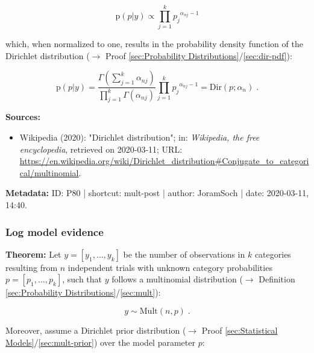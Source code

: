 \documentclass[a4paper,12pt,twoside]{book}
\begin{document}
\begin{equation} \label{eq:mult-post-Mult-post-s2}
\mathrm{p}(p|y) \propto \prod_{j=1}^{k} {p_j}^{\alpha_{nj}-1}
\end{equation}

which, when normalized to one, results in the probability density function of the Dirichlet distribution ($\rightarrow$ Proof \ref{sec:Probability Distributions}/\ref{sec:dir-pdf}):

\begin{equation} \label{eq:mult-post-Mult-post-qed}
\mathrm{p}(p|y) = \frac{\Gamma \left( \sum_{j=1}^{k} \alpha_{nj} \right)}{\prod_{j=1}^k \Gamma(\alpha_{nj})} \prod_{j=1}^{k} {p_j}^{\alpha_{nj}-1} = \mathrm{Dir}(p; \alpha_n) \; .
\end{equation}


\vspace{1em}
\textbf{Sources:}
\begin{itemize}
\item Wikipedia (2020): "Dirichlet distribution"; in: \textit{Wikipedia, the free encyclopedia}, retrieved on 2020-03-11; URL: \url{https://en.wikipedia.org/wiki/Dirichlet_distribution#Conjugate_to_categorical/multinomial}.
\end{itemize}


\vspace{1em}
\textbf{Metadata:} ID: P80 | shortcut: mult-post | author: JoramSoch | date: 2020-03-11, 14:40.
\vspace{1em}



\subsubsection[\textbf{Log model evidence}]{Log model evidence} \label{sec:mult-lme}
\setcounter{equation}{0}

\textbf{Theorem:} Let $y = [y_1, \ldots, y_k]$ be the number of observations in $k$ categories resulting from $n$ independent trials with unknown category probabilities $p = [p_1, \ldots, p_k]$, such that $y$ follows a multinomial distribution ($\rightarrow$ Definition \ref{sec:Probability Distributions}/\ref{sec:mult}):

\begin{equation} \label{eq:mult-lme-Mult}
y \sim \mathrm{Mult}(n,p) \; .
\end{equation}

Moreover, assume a Dirichlet prior distribution ($\rightarrow$ Proof \ref{sec:Statistical Models}/\ref{sec:mult-prior}) over the model parameter $p$:
\end{document}
